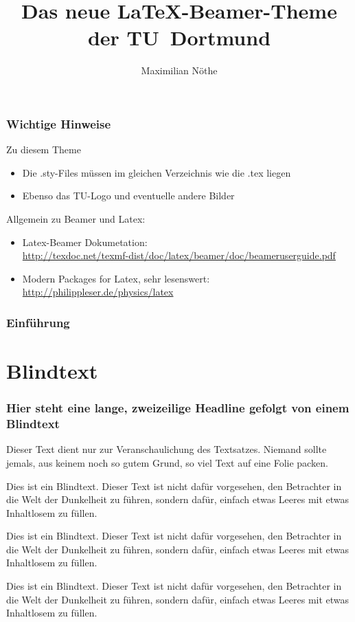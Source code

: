 \documentclass[9pt]{beamer}
\title{Das neue \LaTeX-Beamer-Theme der \mbox{TU Dortmund}}
\author{Maximilian Nöthe}
\institute[Lehrstuhl\\Fakultät]{Names des Lehrstuhls /\par\smallskip\smallskip Name der Fakultät}
\begin{document}
\begin{frame}
\setcounter{framenumber}{0}
    \titlepage
\end{frame}

\begin{frame}
    \frametitle{Wichtige Hinweise}
    Zu diesem Theme
    \begin{itemize}
        \item Die .sty-Files müssen im gleichen Verzeichnis wie die .tex liegen
        \item Ebenso das TU-Logo und eventuelle andere Bilder 
    \end{itemize}
    Allgemein zu Beamer und Latex:
    \begin{itemize}
        \item Latex-Beamer Dokumetation:\\
            \url{http://texdoc.net/texmf-dist/doc/latex/beamer/doc/beameruserguide.pdf}
        \item Modern Packages for Latex, sehr lesenswert:
            \url{http://philippleser.de/physics/latex}
    \end{itemize}
\end{frame}

\begin{frame}
    \frametitle{Einführung}
    \tableofcontents[pausesections]
\end{frame}

\section{Blindtext}
\begin{frame}
	\frametitle{Hier steht eine lange, zweizeilige Headline
		\newline gefolgt von einem Blindtext}
Dieser Text dient nur zur Veranschaulichung des Textsatzes. Niemand sollte jemals, aus keinem noch so gutem Grund, so viel Text auf eine Folie packen.

Dies ist ein Blindtext. Dieser Text ist nicht dafür vorgesehen, den Betrachter in die Welt der Dunkelheit zu führen, sondern dafür, einfach etwas Leeres mit etwas Inhaltlosem zu füllen.

Dies ist ein Blindtext. Dieser Text ist nicht dafür vorgesehen, den Betrachter in die Welt der Dunkelheit zu führen, sondern dafür, einfach etwas Leeres mit etwas Inhaltlosem zu füllen.

Dies ist ein Blindtext. Dieser Text ist nicht dafür vorgesehen, den Betrachter in die Welt der Dunkelheit zu führen, sondern dafür, einfach etwas Leeres mit etwas Inhaltlosem zu füllen.

\end{frame}
\end{document}
